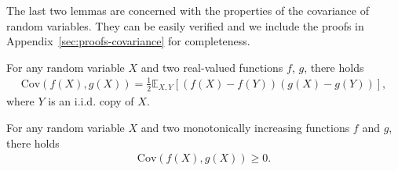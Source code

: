 The last two lemmas are concerned with the properties of the  covariance of random variables. 
They can be easily verified  and we include the proofs in Appendix~\ref{sec:proofs-covariance} for completeness.
\begin{lemma}\label{lem:covariance-identity} For any random variable $X$ and two real-valued functions $f$, $g$, there holds
\begin{align*}
    \mathrm{Cov}(f(X), g(X)) = \frac{1}{2}\mathbb{E}_{X, Y} \left[ (f(X)-f(Y)) (g(X)-g(Y)) \right],
\end{align*}
where $Y$ is an i.i.d. copy of  $X$.

\end{lemma}

\begin{lemma}\label{lem:positive-covariance}
    For any random variable $X$ and two monotonically increasing functions $f$ and $g$, there holds
\begin{align*}
    \mathrm{Cov}(f(X), g(X)) \geq 0.
\end{align*}

\end{lemma}



